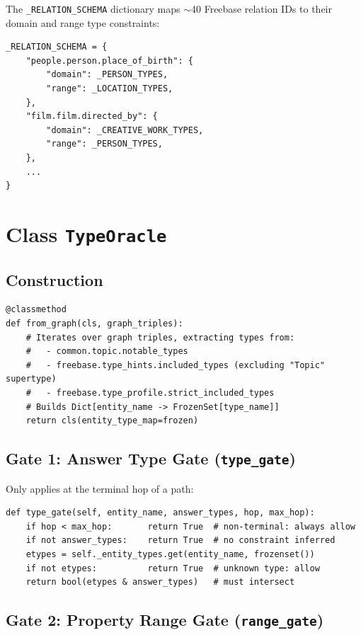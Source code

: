 \documentclass[11pt,a4paper,oneside,openany]{book}
\theoremstyle{definition}
\newcommand{\code}[1]{\texttt{#1}}
\begin{document}
The \code{\_RELATION\_SCHEMA} dictionary maps $\sim$40 Freebase relation IDs to their domain and range type constraints:

\begin{lstlisting}
_RELATION_SCHEMA = {
    "people.person.place_of_birth": {
        "domain": _PERSON_TYPES,
        "range": _LOCATION_TYPES,
    },
    "film.film.directed_by": {
        "domain": _CREATIVE_WORK_TYPES,
        "range": _PERSON_TYPES,
    },
    ...
}
\end{lstlisting}

\section{Class \texttt{TypeOracle}}

\subsection{Construction}

\begin{lstlisting}
@classmethod
def from_graph(cls, graph_triples):
    # Iterates over graph triples, extracting types from:
    #   - common.topic.notable_types
    #   - freebase.type_hints.included_types (excluding "Topic" supertype)
    #   - freebase.type_profile.strict_included_types
    # Builds Dict[entity_name -> FrozenSet[type_name]]
    return cls(entity_type_map=frozen)
\end{lstlisting}

\subsection{Gate 1: Answer Type Gate (\texttt{type\_gate})}

Only applies at the terminal hop of a path:

\begin{lstlisting}
def type_gate(self, entity_name, answer_types, hop, max_hop):
    if hop < max_hop:       return True  # non-terminal: always allow
    if not answer_types:    return True  # no constraint inferred
    etypes = self._entity_types.get(entity_name, frozenset())
    if not etypes:          return True  # unknown type: allow
    return bool(etypes & answer_types)   # must intersect
\end{lstlisting}

\subsection{Gate 2: Property Range Gate (\texttt{range\_gate})}
\end{document}
